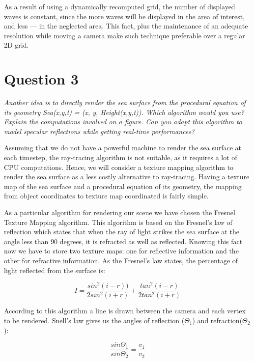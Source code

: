 \documentclass{report}
\begin{document}
As a result of using a dynamically recomputed grid, the number of
displayed waves is constant, since the more waves will be displayed in the
area of interest, and less --- in the neglected area. This fact, plus the
maintenance of an adequate resolution while moving a camera make such
technique preferable over a regular 2D grid.

\section{Question 3}

\emph{Another idea is to directly render the sea surface from the
procedural equation of its geometry Sea(x,y,t) = (x, y, Height(x,y,t)).
Which algorithm would you use? Explain the computations involved on a
figure. Can you adapt this algorithm to model specular reflections while
getting real-time performances?}

Assuming that we do not have a powerful machine to render the sea
surface at each timestep, the ray-tracing algorithm is not
suitable, as it requires a lot of CPU computations. Hence, we will
consider a texture mapping algorithm to render the sea surface as a less
costly alternative to ray-tracing. Having a texture map of the sea
surface and a procedural equation of its geometry, the mapping from
object coordinates to texture map coordinated is fairly simple. 

As a particular algorithm for rendering our scene we have chosen the Fresnel
Texture Mapping algorithm\cite{fresnel}. This algorithm is based on the Fresnel's law
of reflection which states that when the ray of light strikes the
sea surface at the angle less than 90 degrees, it is refracted as well
as reflected. Knowing this fact now we have to store two texture maps:
one for reflective information and the other for refractive information.
As the Fresnel's law states, the percentage of light reflected from the
surface is:

\begin{equation}
  I = \frac{sin^2(i-r))}{2sin^2(i+r)} + \frac{tan^2(i-r)}{2tan^2(i+r)}
\end{equation}

According to this algorithm a line is drawn between the camera and each
vertex to be rendered. Snell's law gives us the angles of
reflection ($\Theta_1$) and refraction($\Theta_2$): 

\begin{equation}
  \frac{sin\Theta_1}{sin\Theta_2} = \frac{v_1}{v_2}
\end{equation}
\end{document}
